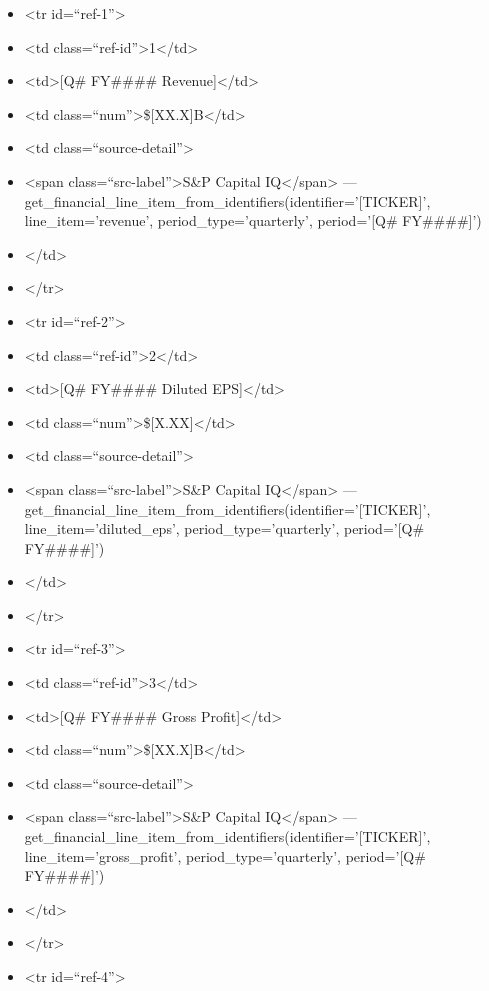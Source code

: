 \documentclass[11pt]{article}
\begin{document}
\begin{itemize}[leftmargin=*,itemsep=2pt,topsep=2pt]
\item {} <tr id=``ref-1''>
\item {} <td class=``ref-id''>1</td>
\item {} <td>[Q\# FY\#\#\#\# Revenue]</td>
\item {} <td class=``num''>\$[XX.X]B</td>
\item {} <td class=``source-detail''>
\item {} <span class=``src-label''>S\&P Capital IQ</span> — get\_\allowbreak{}financial\_\allowbreak{}line\_\allowbreak{}item\_\allowbreak{}from\_\allowbreak{}identifiers(identifier='[TICKER]', line\_\allowbreak{}item='revenue', period\_\allowbreak{}type='quarterly', period='[Q\# FY\#\#\#\#]')
\item {} </td>
\item {} </tr>
\item {} <tr id=``ref-2''>
\item {} <td class=``ref-id''>2</td>
\item {} <td>[Q\# FY\#\#\#\# Diluted EPS]</td>
\item {} <td class=``num''>\$[X.XX]</td>
\item {} <td class=``source-detail''>
\item {} <span class=``src-label''>S\&P Capital IQ</span> — get\_\allowbreak{}financial\_\allowbreak{}line\_\allowbreak{}item\_\allowbreak{}from\_\allowbreak{}identifiers(identifier='[TICKER]', line\_\allowbreak{}item='diluted\_\allowbreak{}eps', period\_\allowbreak{}type='quarterly', period='[Q\# FY\#\#\#\#]')
\item {} </td>
\item {} </tr>
\item {} <tr id=``ref-3''>
\item {} <td class=``ref-id''>3</td>
\item {} <td>[Q\# FY\#\#\#\# Gross Profit]</td>
\item {} <td class=``num''>\$[XX.X]B</td>
\item {} <td class=``source-detail''>
\item {} <span class=``src-label''>S\&P Capital IQ</span> — get\_\allowbreak{}financial\_\allowbreak{}line\_\allowbreak{}item\_\allowbreak{}from\_\allowbreak{}identifiers(identifier='[TICKER]', line\_\allowbreak{}item='gross\_\allowbreak{}profit', period\_\allowbreak{}type='quarterly', period='[Q\# FY\#\#\#\#]')
\item {} </td>
\item {} </tr>
\item {} <tr id=``ref-4''>

\end{itemize}
\end{document}
